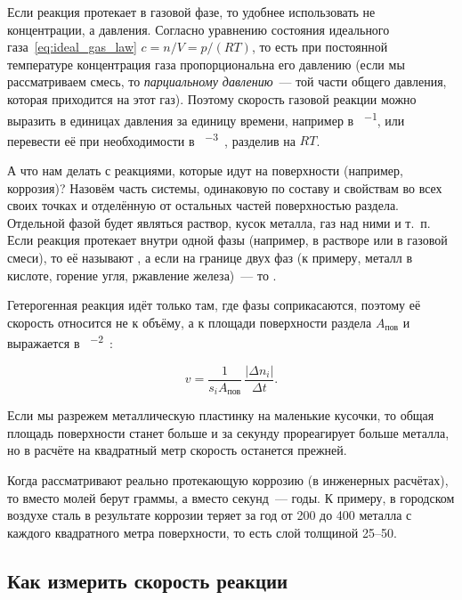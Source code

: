 Если реакция протекает в газовой фазе, то удобнее использовать не концентрации, а давления. Согласно уравнению состояния идеального газа~\eqref{eq:ideal_gas_law} $c = n/V = p/(RT)$, то есть при постоянной температуре концентрация газа пропорциональна его давлению (если мы рассматриваем смесь, то \emph{парциальному давлению}~--- той части общего давления, которая приходится на этот газ). Поэтому скорость газовой реакции можно выразить в единицах давления за единицу времени, например в \unit{\ruPa\per\ruS}, или перевести её при необходимости в \unit{\ruMole\per\ruM\cubed\ruS}, разделив на $RT$.

А что нам делать с реакциями, которые идут на поверхности (например, коррозия)? Назовём  часть системы, одинаковую по составу и свойствам во всех своих точках и отделённую от остальных частей поверхностью раздела. Отдельной фазой будет являться раствор, кусок металла, газ над ними и т.~п. Если реакция протекает внутри одной фазы (например, в растворе или в газовой смеси), то её называют , а если на границе двух фаз (к примеру, металл в кислоте, горение угля, ржавление железа)~--- то .

Гетерогенная реакция идёт только там, где фазы соприкасаются, поэтому её скорость относится не к объёму, а к площади поверхности раздела $A_{\text{пов}}$ и выражается в \unit{\ruMole\per\ruM\squared\ruS}:

\begin{equation}
    \label{eq:surface_reaction_rate}
    v = \frac{1}{s_i A_{\text{пов}}}\,\frac{|\Delta n_i|}{\Delta t}.
\end{equation}

Если мы разрежем металлическую пластинку на маленькие кусочки, то общая площадь поверхности станет больше и за секунду прореагирует больше металла, но в расчёте на квадратный метр скорость останется прежней.

Когда рассматривают реально протекающую коррозию (в инженерных расчётах), то вместо молей берут граммы, а вместо секунд~--- годы. К примеру, в городском воздухе сталь в результате коррозии теряет за год от 200 до \qty{400}{\ruG} металла с каждого квадратного метра поверхности, то есть слой толщиной \num{25}--\qty{50}{\ruUm}.

\subsection*{Как измерить скорость реакции}

